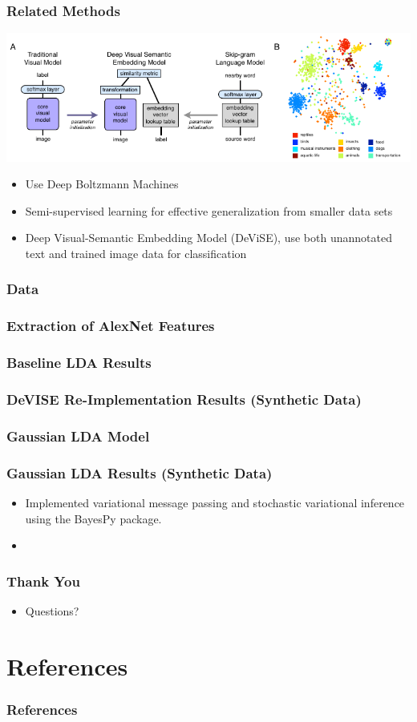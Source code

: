 \documentclass{beamer}
\begin{document}
\begin{frame}
  \frametitle{Related Methods}
  \begin{center}
    \includegraphics[width=\textwidth]{assets/devise.pdf}
  \end{center}
  \begin{itemize}
  \item Use Deep Boltzmann Machines \citep{Srivastava14}
  \item Semi-supervised learning for effective generalization from smaller data sets \citep{Kingma14b}
  \item Deep Visual-Semantic Embedding Model (DeViSE), use both unannotated text and trained image data for classification \citep{Frome13}
  \end{itemize}
\end{frame}

\begin{frame}
  \frametitle{Data}
\end{frame}

\begin{frame}
  \frametitle{Extraction of AlexNet Features}
\end{frame}

\begin{frame}
  \frametitle{Baseline LDA Results}
\end{frame}

\begin{frame}
  \frametitle{DeVISE Re-Implementation Results (Synthetic Data)}
\end{frame}

\begin{frame}
  \frametitle{Gaussian LDA Model} 
\end{frame}

\begin{frame}
  \frametitle{Gaussian LDA Results (Synthetic Data)}
  \begin{itemize}
    \item Implemented variational message passing \citep{Winn05} and stochastic variational inference using the BayesPy \citep{Luttinen14} package. 
    \item 
  \end{itemize}
\end{frame}

\begin{frame}
  \frametitle{Thank You}
  \begin{itemize}
  \item Questions?
  \end{itemize}
\end{frame}

\section{References}
\begin{frame}[t,allowframebreaks]{}
\frametitle{References}
{\small
\printbibliography
\par}
\end{frame}
\end{document}
